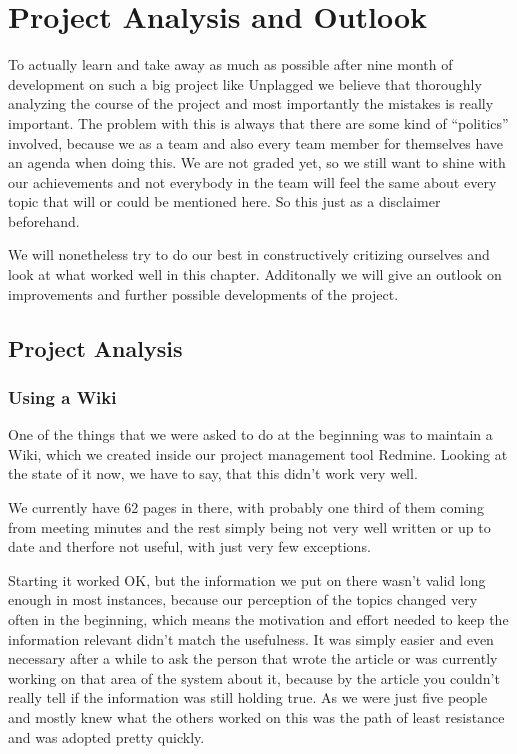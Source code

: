 \chapter{Project Analysis and Outlook}\label{chap:summaryAndOutlook}

To actually learn and take away as much as possible after nine month of development on such a big project like Unplagged we believe that thoroughly analyzing the course of the project and most importantly the mistakes is really important. The problem with this is always that there are some kind of \enquote{politics} involved, because we as a team and also every team member for themselves have an agenda when doing this. We are not graded yet, so we still want to shine with our achievements and not everybody in the team will feel the same about every topic that will or could be mentioned here. So this just as a disclaimer beforehand. 

We will nonetheless try to do our best in constructively critizing ourselves and look at what worked well in this chapter. Additonally we will give an outlook on improvements and further possible developments of the project.

\section{Project Analysis}

\subsection{Using a Wiki}

One of the things that we were asked to do at the beginning was to maintain a Wiki, which we created inside our project management tool Redmine. Looking at the state of it now, we have to say, that this didn't work very well. 

We currently have 62 pages in there, with probably one third of them coming from meeting minutes and the rest simply being not very well written or up to date and therfore not useful, with just very few exceptions.

Starting it worked OK, but the information we put on there wasn't valid long enough in most instances, because our perception of the topics changed very often in the beginning, which means the motivation and effort needed to keep the information relevant didn't match the usefulness. It was simply easier and even necessary after a while to ask the person that wrote the article or was currently working on that area of the system about it, because by the article you couldn't really tell if the information was still holding true. As we were just five people and mostly knew what the others worked on this was the path of least resistance and was adopted pretty quickly.

